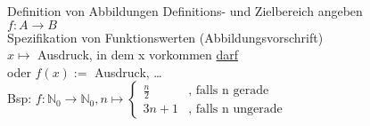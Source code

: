 \begin{frame}{Definition von Abbildungen}
 Definitions- und Zielbereich angeben\\
 $f: A\longrightarrow B$\\
 Spezifikation von Funktionswerten (Abbildungsvorschrift)\\
 $x\mapsto$ Ausdruck, in dem x vorkommen \underline{darf}\\
 oder $f(x) :=$ Ausdruck, \dots\\
 Bsp: $f: \mathbb{N}_0\longrightarrow\mathbb{N}_0, n\mapsto
  \begin{cases}
   \frac{n}{2} & \text{, falls n gerade}   \\
   3n+1        & \text{, falls n ungerade}
  \end{cases}$
\end{frame}

